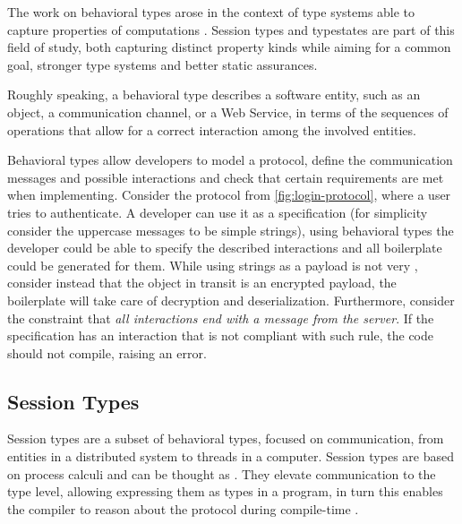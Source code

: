 The work on behavioral types arose in the context of type systems able to capture properties of computations \autocite{Huttel2016}.
Session types and typestates are part of this field of study,
both capturing distinct property kinds while aiming for a common goal,
stronger type systems and better static assurances.

\begin{displayquote}
    Roughly speaking, a behavioral type describes a software entity, such as an object, a communication channel,
    or a Web Service, in terms of the sequences of operations that allow for a correct interaction among the involved entities.
\end{displayquote}

Behavioral types allow developers to model a protocol,
define the communication messages and possible interactions and
check that certain requirements are met when implementing.
Consider the protocol from \autoref{fig:login-protocol},
where a user tries to authenticate.
A developer can use it as a specification
(for simplicity consider the uppercase messages to be simple strings),
using behavioral types the developer could be able to specify the described interactions and all boilerplate could be generated for them.
While using strings as a payload is not very ,
consider instead that the object in transit is an encrypted payload,
the boilerplate will take care of decryption and deserialization.
Furthermore, consider the constraint that \emph{all interactions end with a message from the server}.
If the specification has an interaction that is not compliant with such rule,
the code should not compile, raising an error.



\subsection{Session Types}

Session types are a subset of behavioral types, focused on communication,
from entities in a distributed system to threads in a computer.
Session types are based on process calculi and can be thought as  \autocite{Honda1993, Honda1998}.
They elevate communication to the type level, allowing expressing them as types in a program,
in turn this enables the compiler to reason about the protocol during compile-time \autocite{Gay2015, Vasconcelos2006}.

